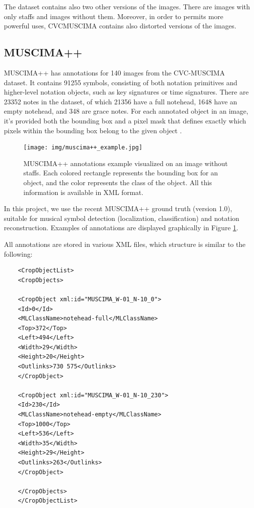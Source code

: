 \documentclass[journal]{IEEEtran}
\begin{document}
	The dataset contains also two other versions of the images. There are images with only staffs and images without them. Moreover, in order to permits more powerful uses, CVCMUSCIMA contains also distorted versions of the images.
	
	\subsection{MUSCIMA++}
	MUSCIMA++ has annotations for 140 images from the CVC-MUSCIMA dataset. It contains 91255 symbols, consisting of both notation primitives and higher-level notation objects, such as key signatures or time signatures. There are 23352 notes in the dataset, of which 21356 have a full notehead, 1648 have an empty notehead, and 348 are grace notes. For each annotated object in an image, it's provided both the bounding box and a pixel mask that defines exactly which pixels within the bounding box belong to the given object \cite{MUSCIMA++-LINK}.
	
	\begin{figure} [h]
		\begin{center}
			\texttt{[image: img/muscima++\_example.jpg]}\\
			\caption{MUSCIMA++ annotations example visualized on an image without staffs. Each colored rectangle represents the bounding box for an object, and the color represents the class of the object. All this information is available in XML format.}
			\label{fig:muscima++_example}
		\end{center}
	\end{figure}

	In this project, we use the recent MUSCIMA++ ground truth (version 1.0), suitable for musical symbol detection (localization, classification) and notation reconstruction. Examples of annotations are displayed graphically in Figure \ref{fig:muscima++_example}. 
	
	All annotations are stored in various XML files, which structure is similar to the following:
	
	\begin{verbatim}
	<CropObjectList>
	<CropObjects>
	
	<CropObject xml:id="MUSCIMA_W-01_N-10_0">
	<Id>0</Id>
	<MLClassName>notehead-full</MLClassName>
	<Top>372</Top>
	<Left>494</Left>
	<Width>29</Width>
	<Height>20</Height>
	<Outlinks>730 575</Outlinks>
	</CropObject>
	
	<CropObject xml:id="MUSCIMA_W-01_N-10_230">
	<Id>230</Id>
	<MLClassName>notehead-empty</MLClassName>
	<Top>1000</Top>
	<Left>536</Left>
	<Width>35</Width>
	<Height>29</Height>
	<Outlinks>263</Outlinks>
	</CropObject>
	
	</CropObjects>
	</CropObjectList>
	\end{verbatim}
	
\end{document}
